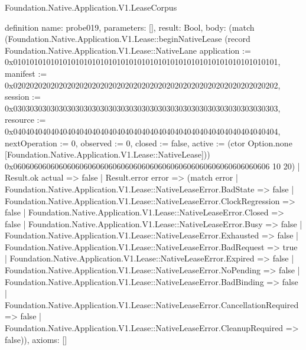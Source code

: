 \begin{lexlean}{Foundation.Native.Application.V1.LeaseCorpus}
\begin{semanticmodule}
definition{
  name: probe019,
  parameters: [],
  result: Bool,
  body: (match (Foundation.Native.Application.V1.Lease::beginNativeLease (record Foundation.Native.Application.V1.Lease::NativeLane {application := 0x0101010101010101010101010101010101010101010101010101010101010101, manifest := 0x0202020202020202020202020202020202020202020202020202020202020202, session := 0x0303030303030303030303030303030303030303030303030303030303030303, resource := 0x0404040404040404040404040404040404040404040404040404040404040404, nextOperation := 0, observed := 0, closed := false, active := (ctor Option.none [Foundation.Native.Application.V1.Lease::NativeLease])}) 0x06060606060606060606060606060606060606060606060606060606060606 10 20)
    | Result.ok actual => false
    | Result.error error => (match error
      | Foundation.Native.Application.V1.Lease::NativeLeaseError.BadState => false
      | Foundation.Native.Application.V1.Lease::NativeLeaseError.ClockRegression => false
      | Foundation.Native.Application.V1.Lease::NativeLeaseError.Closed => false
      | Foundation.Native.Application.V1.Lease::NativeLeaseError.Busy => false
      | Foundation.Native.Application.V1.Lease::NativeLeaseError.Exhausted => false
      | Foundation.Native.Application.V1.Lease::NativeLeaseError.BadRequest => true
      | Foundation.Native.Application.V1.Lease::NativeLeaseError.Expired => false
      | Foundation.Native.Application.V1.Lease::NativeLeaseError.NoPending => false
      | Foundation.Native.Application.V1.Lease::NativeLeaseError.BadBinding => false
      | Foundation.Native.Application.V1.Lease::NativeLeaseError.CancellationRequired => false
      | Foundation.Native.Application.V1.Lease::NativeLeaseError.CleanupRequired => false)),
  axioms: []
}


\end{semanticmodule}
\end{lexlean}

